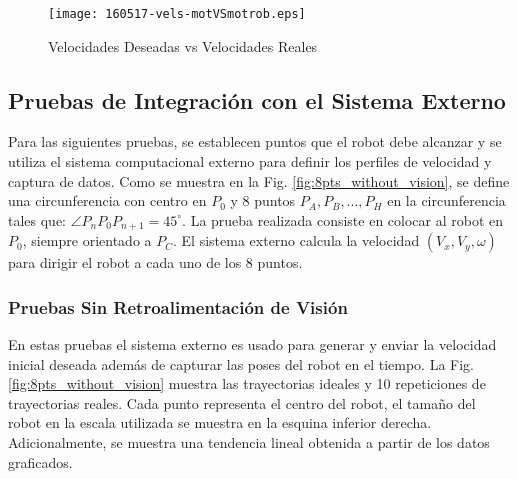 \begin{sidewaysfigure}
	\centering
		\texttt{[image: 160517-vels-motVSmotrob.eps]}
	\caption{Velocidades Deseadas vs Velocidades Reales}
	\label{fig:vels_real_vs_des_mot}
\end{sidewaysfigure}




\subsection{Pruebas de Integración con el Sistema Externo}
\label{subsec:pruebas_sin_vision}
Para las siguientes pruebas, se establecen puntos que el robot debe alcanzar y se utiliza el sistema computacional externo para definir los perfiles de velocidad y captura de datos. Como se muestra en la Fig. \ref{fig:8pts_without_vision}, se define una circunferencia con centro en $P_0$ y 8 puntos ${P_A, P_B, ..., P_H}$ en la circunferencia tales que: $\angle P_nP_0P_{n+1} = 45^\circ $. La prueba realizada consiste en colocar al robot en $P_0$, siempre orientado a $P_C$. El sistema externo calcula la velocidad $(V_x,V_y,\omega)$ para dirigir el robot a cada uno de los 8 puntos. 

\subsubsection{Pruebas Sin Retroalimentación de Visión}
En estas pruebas el sistema externo es usado para generar y enviar la velocidad inicial deseada además de capturar las poses del robot en el tiempo. La Fig. \ref{fig:8pts_without_vision} muestra las trayectorias ideales y 10 repeticiones de trayectorias reales. Cada punto representa el centro del robot, el tamaño del robot en la escala utilizada se muestra en la esquina inferior derecha. Adicionalmente, se muestra una tendencia lineal obtenida a partir de los datos graficados. 

